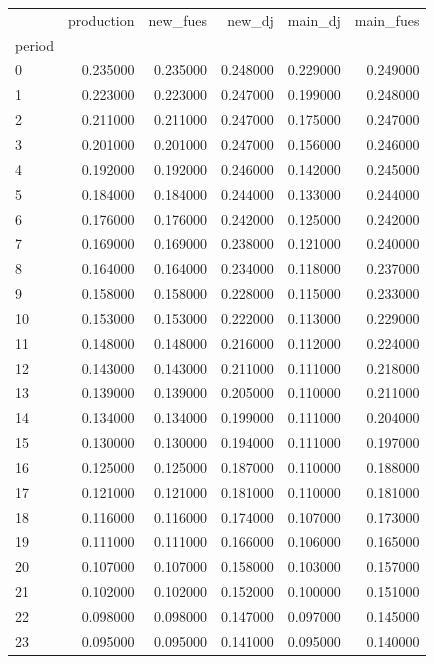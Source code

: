 \begin{tabular}{lrrrrr}
\toprule
 & production & new_fues & new_dj & main_dj & main_fues \\
period &  &  &  &  &  \\
\midrule
0 & 0.235000 & 0.235000 & 0.248000 & 0.229000 & 0.249000 \\
1 & 0.223000 & 0.223000 & 0.247000 & 0.199000 & 0.248000 \\
2 & 0.211000 & 0.211000 & 0.247000 & 0.175000 & 0.247000 \\
3 & 0.201000 & 0.201000 & 0.247000 & 0.156000 & 0.246000 \\
4 & 0.192000 & 0.192000 & 0.246000 & 0.142000 & 0.245000 \\
5 & 0.184000 & 0.184000 & 0.244000 & 0.133000 & 0.244000 \\
6 & 0.176000 & 0.176000 & 0.242000 & 0.125000 & 0.242000 \\
7 & 0.169000 & 0.169000 & 0.238000 & 0.121000 & 0.240000 \\
8 & 0.164000 & 0.164000 & 0.234000 & 0.118000 & 0.237000 \\
9 & 0.158000 & 0.158000 & 0.228000 & 0.115000 & 0.233000 \\
10 & 0.153000 & 0.153000 & 0.222000 & 0.113000 & 0.229000 \\
11 & 0.148000 & 0.148000 & 0.216000 & 0.112000 & 0.224000 \\
12 & 0.143000 & 0.143000 & 0.211000 & 0.111000 & 0.218000 \\
13 & 0.139000 & 0.139000 & 0.205000 & 0.110000 & 0.211000 \\
14 & 0.134000 & 0.134000 & 0.199000 & 0.111000 & 0.204000 \\
15 & 0.130000 & 0.130000 & 0.194000 & 0.111000 & 0.197000 \\
16 & 0.125000 & 0.125000 & 0.187000 & 0.110000 & 0.188000 \\
17 & 0.121000 & 0.121000 & 0.181000 & 0.110000 & 0.181000 \\
18 & 0.116000 & 0.116000 & 0.174000 & 0.107000 & 0.173000 \\
19 & 0.111000 & 0.111000 & 0.166000 & 0.106000 & 0.165000 \\
20 & 0.107000 & 0.107000 & 0.158000 & 0.103000 & 0.157000 \\
21 & 0.102000 & 0.102000 & 0.152000 & 0.100000 & 0.151000 \\
22 & 0.098000 & 0.098000 & 0.147000 & 0.097000 & 0.145000 \\
23 & 0.095000 & 0.095000 & 0.141000 & 0.095000 & 0.140000 \\

\end{tabular}
